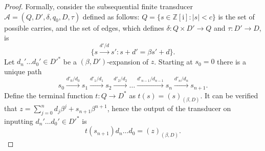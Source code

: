 \documentclass{amsart}
\newcommand{\Z}{\mathbb{Z}}
\newcommand{\ii}{\mathrm{i}}
\newtheorem*{main theorem}{Theorem \ref{thm:main-gaussian}}
\theoremstyle{definition}
\begin{document}
\begin{proof}
Formally, consider the subsequential finite transducer $\mathcal A=(Q,D',\delta, q_{0}, D, \tau)$
  defined as follows: $Q= \{s\in \Z[\ii]:|s|<c\}$ is the set of possible carries, and the set of edges, which defines 
  $\delta:Q\times D'\rightarrow Q$ and $\tau:D'\rightarrow D$, is
\[ \{s\stackrel{d'/d}{\longrightarrow}s': s+d'=\beta s'+d\}.\]
Let $d_n'\dots d_0'\in D'^*$ be a $( \beta, D')$-expansion of $z$. Starting at $s_0=0$ there is a unique path
\[s_0\stackrel{d'_0/d_0}{\longrightarrow}s_1 
\stackrel{d'_1/d_1}{\longrightarrow}s_2
\stackrel{d'_2/d_2}{\longrightarrow}
\dots
\stackrel{d'_{n-1}/d_{n-1}}{\longrightarrow}s_n
\stackrel{d'_n/d_n}{\longrightarrow}s_{n+1}.
\]
Define the terminal function $t:Q\rightarrow D^*$ as $t(s)=(s)_{(\beta,D)}$.
It can be verified that 
$z= \sum_{j=0}^n d_j\beta^j
+s_{n+1}\beta^{n+1}$, hence the output of the transducer on inputting $d_n'\dots d_0'\in D'^*$ is \[t(s_{n+1}) d_n\dots d_0  = (z)_{(\beta, D)}.\]\end{proof}
\end{document}

